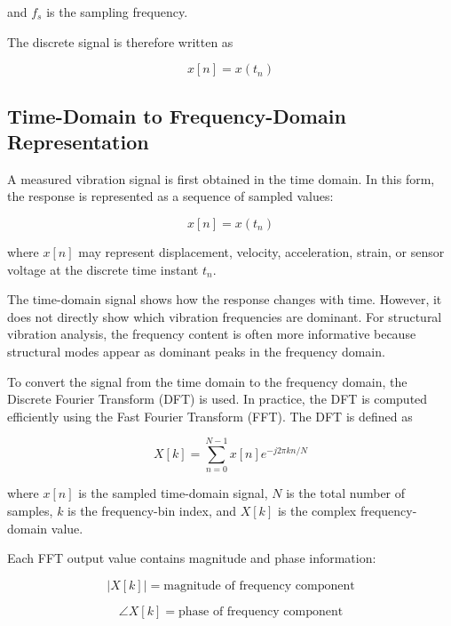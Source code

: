 \documentclass[11pt,a4paper]{article}
\begin{document}
and \(f_s\) is the sampling frequency.

The discrete signal is therefore written as

\begin{equation}
x[n] = x(t_n)
\end{equation}

\subsection{Time-Domain to Frequency-Domain Representation}

A measured vibration signal is first obtained in the time domain. In this form, the response is represented as a sequence of sampled values:

\begin{equation}
x[n] = x(t_n)
\end{equation}

where \(x[n]\) may represent displacement, velocity, acceleration, strain, or sensor voltage at the discrete time instant \(t_n\).

The time-domain signal shows how the response changes with time. However, it does not directly show which vibration frequencies are dominant. For structural vibration analysis, the frequency content is often more informative because structural modes appear as dominant peaks in the frequency domain.

To convert the signal from the time domain to the frequency domain, the Discrete Fourier Transform (DFT) is used. In practice, the DFT is computed efficiently using the Fast Fourier Transform (FFT). The DFT is defined as

\begin{equation}
X[k] = \sum_{n=0}^{N-1} x[n] e^{-j2\pi kn/N}
\end{equation}

where \(x[n]\) is the sampled time-domain signal, \(N\) is the total number of samples, \(k\) is the frequency-bin index, and \(X[k]\) is the complex frequency-domain value.

Each FFT output value contains magnitude and phase information:

\begin{equation}
|X[k]| = \text{magnitude of frequency component}
\end{equation}

\begin{equation}
\angle X[k] = \text{phase of frequency component}
\end{equation}
\end{document}
